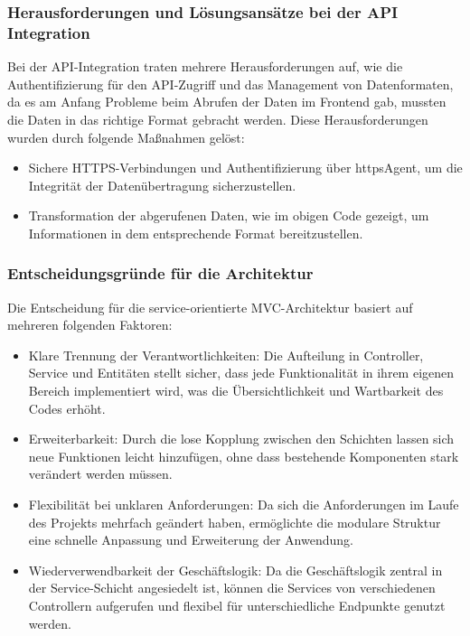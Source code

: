 \subsubsection*{Herausforderungen und Lösungsansätze bei der API Integration}
Bei der API-Integration traten mehrere Herausforderungen auf, wie die Authentifizierung für den API-Zugriff und das Management von Datenformaten, da es am Anfang Probleme beim Abrufen der Daten im Frontend gab, mussten die Daten in das richtige Format gebracht werden. Diese Herausforderungen wurden durch folgende Maßnahmen gelöst:
\begin{itemize}
    \item Sichere HTTPS-Verbindungen und Authentifizierung über httpsAgent, um die Integrität der Datenübertragung sicherzustellen.
    \item Transformation der abgerufenen Daten, wie im obigen Code gezeigt, um Informationen in dem entsprechende Format bereitzustellen.
\end{itemize}
\subsubsection*{Entscheidungsgründe für die Architektur}
Die Entscheidung für die service-orientierte MVC-Architektur basiert auf mehreren folgenden Faktoren:
\begin{itemize}
    \item Klare Trennung der Verantwortlichkeiten: Die Aufteilung in Controller, Service und Entitäten stellt sicher, dass jede Funktionalität in ihrem eigenen Bereich implementiert wird, was die Übersichtlichkeit und Wartbarkeit des Codes erhöht.
    \item Erweiterbarkeit: Durch die lose Kopplung zwischen den Schichten lassen sich neue Funktionen leicht hinzufügen, ohne dass bestehende Komponenten stark verändert werden müssen.
    \item Flexibilität bei unklaren Anforderungen: Da sich die Anforderungen im Laufe des Projekts mehrfach geändert haben, ermöglichte die modulare Struktur eine schnelle Anpassung und Erweiterung der Anwendung.
    \item Wiederverwendbarkeit der Geschäftslogik: Da die Geschäftslogik zentral in der Service-Schicht angesiedelt ist, können die Services von verschiedenen Controllern aufgerufen und flexibel für unterschiedliche Endpunkte genutzt werden.
\end{itemize}
